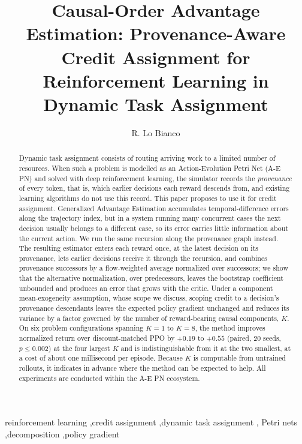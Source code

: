 \documentclass[review,authoryear,3p,times]{elsarticle}
\begin{document}
\begin{frontmatter}

\title{Causal-Order Advantage Estimation: Provenance-Aware Credit
Assignment for Reinforcement Learning in Dynamic Task Assignment}

\author[tue]{R. Lo Bianco}
\address[tue]{Eindhoven University of Technology, The Netherlands}

\begin{abstract}
Dynamic task assignment consists of routing arriving work to a limited number
of resources. When such a problem is modelled as an Action-Evolution Petri Net
(A-E PN) and solved with deep reinforcement learning, the simulator records the
\emph{provenance} of every token, that is, which earlier decisions each reward
descends from, and existing learning algorithms do not use this record. This
paper proposes to use it for credit assignment. Generalized Advantage
Estimation accumulates temporal-difference errors along the trajectory index,
but in a system running many concurrent cases the next decision usually
belongs to a different case, so its error carries little information about the
current action. We run the same recursion along the provenance graph instead.
The resulting estimator enters each reward once, at the latest decision on
its provenance, lets earlier decisions receive it through the recursion, and
combines provenance successors by a flow-weighted average normalized over
successors;
we show that the alternative normalization, over predecessors, leaves the
bootstrap coefficient unbounded and produces an error that grows with the
critic. Under a component mean-exogeneity assumption, whose scope we discuss,
scoping credit to a decision's provenance descendants leaves the expected
policy gradient unchanged and reduces its variance by a factor governed by the
number of reward-bearing causal components, $K$. On six problem configurations
spanning $K=1$ to $K=8$, the method improves normalized return over
discount-matched PPO by $+0.19$ to $+0.55$ (paired, $20$ seeds, $p\le0.002$) at
the four largest $K$ and is indistinguishable from it at the two smallest, at a
cost of about one millisecond per episode. Because $K$ is computable from
untrained rollouts, it indicates in advance where the method can be expected
to help. All experiments are conducted within the A-E PN ecosystem.
\end{abstract}

\begin{keyword}
reinforcement learning \sep credit assignment \sep dynamic task assignment \sep
Petri nets \sep decomposition \sep policy gradient
\end{keyword}

\end{frontmatter}
\end{document}
